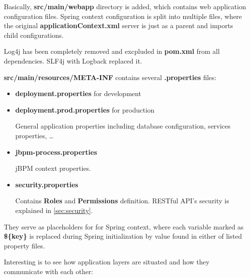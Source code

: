 	Basically, \textbf{src/main/webapp} directory is added, which contains web application configuration files. Spring
	context configuration is split into multiple files, where the original \textbf{applicationContext.xml} server is just
	as a parent and imports child configurations.
	
	Log4j has been completely removed and excpluded in \textbf{pom.xml} from all dependencies. SLF4j with Logback replaced
	it.
	
	\textbf{src/main/resources/META-INF} contains several \textbf{.properties} files:
	
	\begin{itemize}
		\item \textbf{deployment.properties} for development
		\item \textbf{deployment.prod.properties} for production
		
		General application properties including database configuration, services properties, \ldots
		\item \textbf{jbpm-process.properties}
		
		jBPM context properties.
		\item \textbf{security.properties}
		
		Contains \textbf{Roles} and \textbf{Permissions} definition. RESTful API's security is explained in
		\ref{sec:security}.
	\end{itemize}
	
	They serve as placeholders for for Spring context, where each variable marked as \textbf{\$\{key\}} is replaced during
	Spring initialization by value found in either of listed property files.
	
	Interesting is to see how application layers are situated and how they communicate with each other:
	
